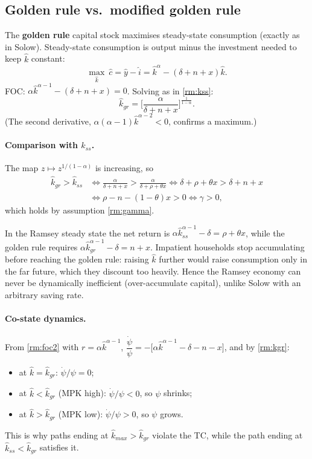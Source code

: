\subsection{Golden rule vs.\ modified golden rule }

The \textbf{golden rule} capital stock maximises steady-state consumption (exactly as in Solow). Steady-state consumption is output minus the investment needed to keep $\hat k$ constant:
\[
\max_{\hat k}\ \hat c=\hat y-\hat i=\hat k^\alpha-(\delta+n+x)\hat k .
\]
FOC: $\alpha\hat k^{\alpha-1}-(\delta+n+x)=0$. Solving as in \eqref{rm:kss}:
\begin{equation}
\hat k_{gr}=\Big[\frac{\alpha}{\delta+n+x}\Big]^{\frac1{1-\alpha}} . \label{rm:kgr}
\end{equation}
(The second derivative, $\alpha(\alpha-1)\hat k^{\alpha-2}<0$, confirms a maximum.)

\paragraph{Comparison with $\hat k_{ss}$.} The map $z\mapsto z^{1/(1-\alpha)}$ is increasing, so
\begin{align*}
\hat k_{gr}>\hat k_{ss}
&\iff \frac{\alpha}{\delta+n+x}>\frac{\alpha}{\delta+\rho+\theta x}
\iff \delta+\rho+\theta x>\delta+n+x\\
&\iff \rho-n-(1-\theta)x>0\iff\gamma>0,
\end{align*}
which holds by assumption \eqref{rm:gamma}.

\begin{keybox}[title={Modified golden rule: $\hat k_{ss}<\hat k_{gr}$}]
In the Ramsey steady state the net return is $\alpha\hat k_{ss}^{\alpha-1}-\delta=\rho+\theta x$, while the golden rule requires $\alpha\hat k_{gr}^{\alpha-1}-\delta=n+x$. Impatient households stop accumulating before reaching the golden rule: raising $\hat k$ further would raise consumption only in the far future, which they discount too heavily. Hence the Ramsey economy can never be dynamically inefficient (over-accumulate capital), unlike Solow with an arbitrary saving rate.
\end{keybox}

\paragraph{Co-state dynamics.} From \eqref{rm:foc2} with $r=\alpha\hat k^{\alpha-1}$, $\dfrac{\dot\psi}{\psi}=-\big[\alpha\hat k^{\alpha-1}-\delta-n-x\big]$, and by \eqref{rm:kgr}:
\begin{itemize}
\item at $\hat k=\hat k_{gr}$: $\dot\psi/\psi=0$;
\item at $\hat k<\hat k_{gr}$ (MPK high): $\dot\psi/\psi<0$, so $\psi$ shrinks;
\item at $\hat k>\hat k_{gr}$ (MPK low): $\dot\psi/\psi>0$, so $\psi$ grows.
\end{itemize}
This is why paths ending at $\hat k_{max}>\hat k_{gr}$ violate the TC, while the path ending at $\hat k_{ss}<\hat k_{gr}$ satisfies it.

